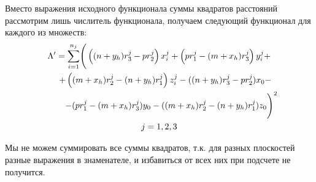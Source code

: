 \vspace{1cm}
Вместо выражения исходного функционала суммы квадратов расстояний рассмотрим лишь числитель функционала, получаем следующий функционал для каждого из множеств:
$$\begin{gathered}
	\Lambda' = \underset{i=1}{\overset{n_j}{\sum}} \Bigg( \left( (n+y_h)r_3^j - p r_2^j \right)x_i^j + \left( p r_1^j - (m+x_h) r_3^j \right)y_i^j + \\ 
	\hspace{0.5cm} + \left( (m+x_h)r_2^j - (n+y_h)r_1^j \right) z_i^j - ((n + y_h) r_3^j - p r_2^j) x_0 -  \\
	\hspace{1cm} - (p r_1^j - (m + x_h) r_3^j) y_0 - ((m + x_h) r_2^j - (n + y_h) r_1^j) z_0 \Bigg)^2 \\
	j = 1,2,3
\end{gathered}$$

Мы не можем суммировать все суммы квадратов, т.к. для разных плоскостей разные выражения в знаменателе, и избавиться от всех них при подсчете не получится.\\

